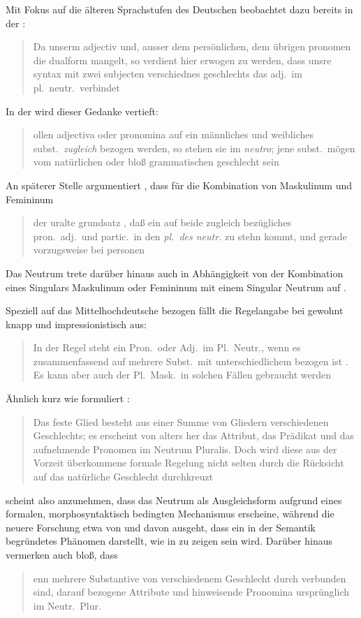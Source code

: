 Mit Fokus auf die älteren Sprachstufen des Deutschen beobachtet dazu bereits
\citeauthor{grimm1848} in der :
\blockcquote[978]{grimm1848}{Da unserm adjectiv und, ausser dem
persönlichen, dem übrigen pronomen die dualform mangelt, so verdient
hier erwogen zu werden, dass unsre syntax mit zwei subjecten verschiednes
geschlechts das adj.\ im pl.~neutr.\ verbindet}. In der  wird dieser Gedanke vertieft:
\blockcquote[311--312]{grimm1890}{ollen adjectiva oder pronomina
auf ein männliches und weibliches subst.\ \emph{zugleich} bezogen werden, so
stehen sie im \emph{neutro}; jene subst.\ mögen vom natürlichen oder bloß
grammatischen geschlecht sein}. An späterer Stelle argumentiert
\citeauthor{grimm1898}, dass für die Kombination von Maskulinum und Femininum
\blockcquote[329]{grimm1898}{der uralte grundsatz , daß ein auf
beide zugleich bezügliches pron.\ adj.\ und partic.\ in den \emph{pl.\ des
\mbox{neutr.}} zu stehn kommt, und gerade vorzugsweise bei personen}. Das
Neutrum trete darüber hinaus auch in Abhängigkeit von der Kombination eines
Singulars Maskulinum oder Femininum mit einem Singular Neutrum auf
\autocite[331]{grimm1898}.

Speziell auf das Mittelhochdeutsche bezogen fällt die
Regelangabe bei \citeauthor{paul2007} gewohnt knapp und impressionistisch aus:
\blockcquote[384]{paul2007}{In der Regel steht ein Pron.\ oder Adj.\ im
Pl.~Neutr., wenn es zusammenfassend auf mehrere Subst.\ mit unterschiedlichem
 bezogen ist \textelp{}. Es kann aber auch der Pl.~Mask.\ in solchen
Fällen gebraucht werden}. Ähnlich kurz wie \citet{paul2007} formuliert
\citet[39]{behaghel1928}: \blockquote{Das feste Glied besteht aus einer Summe
von Gliedern verschiedenen Geschlechts; es erscheint von alters her das
Attribut, das Prädikat und das aufnehmende Pronomen im Neutrum
Pluralis. \textelp{} Doch wird diese aus der Vorzeit überkommene formale
Regelung nicht selten durch die Rücksicht auf das natürliche Geschlecht
durchkreuzt}.

\citet{behaghel1928} scheint also anzunehmen, dass das Neutrum als
Ausgleichsform aufgrund eines formalen, morphosyntaktisch bedingten Mechanismus
erscheine, während die neuere Forschung etwa von \citet{wechslerzlatic2003} und
\citet{wechsler2009} davon ausgeht, dass  ein in der
Semantik begründetes Phänomen darstellt, wie in  zu
zeigen sein wird. Darüber hinaus vermerken auch \citet[188]{dal2014} bloß, dass
\blockquote{enn mehrere Substantive von verschiedenem Geschlecht
durch  verbunden sind, \textelp{} darauf bezogene
Attribute und hinweisende Pronomina ursprünglich im Neutr.\ Plur.\
}.

